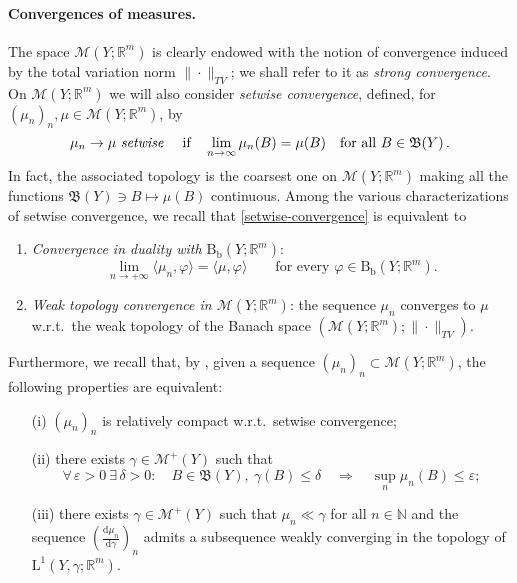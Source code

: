 \documentclass[11pt,reqno]{amsart}
\numberwithin{equation}{section}
\newcommand{\N}{\mathbb{N}}
\newcommand{\R}{\mathbb{R}}
\newcommand{\calM}{\mathcal{M}}
\newcommand{\eps}{\varepsilon}
\newcommand{\dd}{\mathrm{d}}
\theoremstyle{definition}
\newcommand{\ep}{\varepsilon}
\let\eps\ep
\def\dd{\mathrm{d}}
\newcommand{\Bb}{\mathrm{B}_{\mathrm b}}
\newcommand{\pinfty}{{+\infty}}
\newcommand{\frB}{\mathfrak B}
\newcommand{\rmL}{\mathrm{L}}
\newcommand{\RCR}{\color{magenta}}
\newcommand{\RNEW}{\color{black}} %
\newcommand{\EEE}{\color{black}}
\numberwithin{equation}{section}
\begin{document}
\paragraph{\bf Convergences of measures.}
The space 
$\calM(Y;\R^m)$ is clearly endowed with the notion of convergence induced by the total variation norm  $\|\cdot\|_{TV}$; we shall refer to it as \emph{strong convergence}. On
$\calM(Y;\R^m)$ we will 
  also consider \emph{setwise convergence}, defined, for $(\mu_n)_n, \mu \in \calM(Y;\R^m)$, by 
  \begin{equation}
  \label{setwise-convergence}
  \mu_n \to \mu \text{ \emph{setwise} }  \quad \text{if}  \quad \lim_{n\to\infty}  \mu_n(B) = \mu(B) \quad \text{for all } B \in \frB(Y)\,.
  \end{equation}
  \RCR In fact, the associated topology is the coarsest one on $\calM(Y;\R^m)$ making all the functions $ \frB(Y)\ni B
  \mapsto  \mu(B) $ continuous. 
 \EEE
  Among the various characterizations of setwise convergence, we recall  \cite[\S 4.7(v)]{Bogachev07} that \eqref{setwise-convergence} is equivalent to 
 \begin{enumerate}
 \item \emph{Convergence in duality with $\Bb(Y;\R^m)$}:
   \begin{equation}
     \label{eq:70}
     \lim_{n\to\pinfty}\langle \mu_n,\varphi\rangle=
     \langle \mu,\varphi\rangle
     \qquad
     \text{for every $\varphi\in \Bb(Y;\R^m)$}.
   \end{equation}
 \item \emph{Weak topology convergence in $ \calM(Y;\R^m)$}:
   the sequence $\mu_n$ converges to $\mu$ w.r.t.\ the weak topology
   of the Banach space $(\calM(Y;\R^m);\|\cdot\|_{TV})$.
   \end{enumerate}
   Furthermore,  \RNEW we recall that, 
   by  \cite[Thm.\ 4.7.25)]{Bogachev07}, given a sequence $(\mu_n)_n \subset \calM(Y;\R^m) $, 
   the following properties are equivalent: \EEE
   \begin{itemize}
   \item[(i)]    $(\mu_n)_n$ is relatively compact w.r.t.\ setwise convergence;
   \item[(ii)]    
   \RNEW   there exists $\gamma \in \calM^+(Y)$ such that \EEE
      \begin{equation}
         \label{eq:73}
         \forall\,\eps>0\ \exists\,\delta>0:
         \quad
         B\in \frB(Y),\ \gamma(B)\le \delta\quad
         \Rightarrow\quad
         \sup_{n}\mu_n(B)\le \eps;
       \end{equation}
          \item[(iii)]  \RNEW  there exists $\gamma \in \calM^+(Y)$ such that $\mu_n \ll \gamma$ for all $n\in \N$ and the sequence $\left(\frac{\dd \mu_n}{\dd \gamma}\right)_n$
          admits a subsequence weakly converging in the topology of $\rmL^1(Y,\gamma;\R^m)$.
       \end{itemize}
\end{document}
